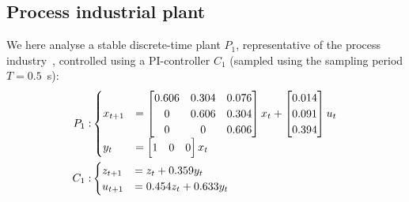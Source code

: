 \subsection{Process industrial plant}\label{sec:eval:stable}
We here analyse a stable discrete-time plant $P_1$, representative of the process industry~\cite{Hagglund:2002}, controlled using a PI-controller $C_1$ (sampled using the sampling period $T = 0.5$~s):
\begin{equation*}%
    {%
    \begin{aligned}
        P_1: &
        \begin{cases}
            x_{t+1} &= \begin{bmatrix}
                0.606 & 0.304 & 0.076 \\
                0 & 0.606 & 0.304 \\
                0 & 0 & 0.606 \\
            \end{bmatrix} x_t + \begin{bmatrix}
                0.014 \\
                0.091 \\
                0.394 \\
            \end{bmatrix} u_t \\
            y_t &= \begin{bmatrix}
                1 & 0 & 0
            \end{bmatrix} x_t
        \end{cases} \\
        C_1: &
        \begin{cases}
            z_{t+1} &= z_t + 0.359 y_t \\
            u_{t+1} &= 0.454 z_t + 0.633 y_t
        \end{cases}
    \end{aligned}
    }
\end{equation*}

\afterpage{
    \clearpage
    \begin{landscape}
        
    \end{landscape}
    \clearpage
}
\afterpage{
    \clearpage
    \begin{landscape}
        
    \end{landscape}
    \clearpage
}

